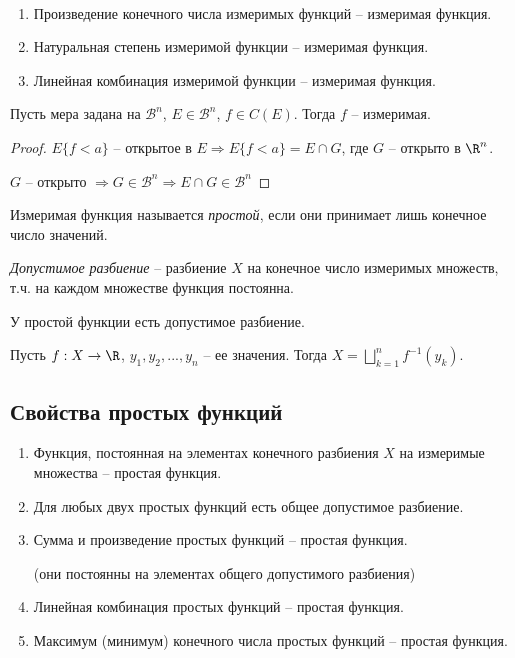 \begin{corollary}~
    \begin{enumerate}
        \item Произведение конечного числа измеримых функций – измеримая функция.
        \item Натуральная степень измеримой функции – измеримая функция.
        \item Линейная комбинация измеримой функции – измеримая функция.
    \end{enumerate}
\end{corollary}

\begin{theorem}
    Пусть мера задана на $\mathcal{B}^n$, $E\in \mathcal{B}^n$, $f\in C(E)$.
    Тогда $f$ – измеримая.
\end{theorem}

\begin{proof}
    $E\{f< a\}$ – открытое в $E\Rightarrow E\{f<a\}=E\cap G$, где $G$ – открыто в $\R^n$.

    $G$ – открыто $\Rightarrow G\in\mathcal{B}^n\Rightarrow E\cap G \in \mathcal{B}^n$
\end{proof}

\begin{definition}
    Измеримая функция называется \textit{простой}, если они принимает лишь 
    конечное число значений.
\end{definition}

\begin{definition}
    \textit{Допустимое разбиение} – разбиение $X$ на конечное число измеримых множеств,
    т.ч. на каждом множестве функция постоянна.
\end{definition}

\begin{remark}
    У простой функции есть допустимое разбиение.

    Пусть $f:X\rightarrow \R$, $y_1, y_2, ..., y_n$ – ее значения. 
    Тогда $X=\bigsqcup\limits_{k=1}^n f^{-1}(y_k)$.
\end{remark}

\subsection*{Свойства простых функций}

\begin{enumerate}
    \item Функция, постоянная на элементах конечного разбиения $X$ на 
    измеримые множества – простая функция.

    \item Для любых двух простых функций есть общее допустимое разбиение.
    
    \item Сумма и произведение простых функций – простая функция.
    
    (они постоянны на элементах общего допустимого разбиения)
    \item Линейная комбинация простых функций – простая функция.
    \item Максимум (минимум) конечного числа простых функций – простая функция.
\end{enumerate}

